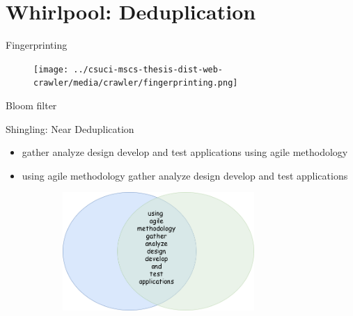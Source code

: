 \documentclass[9pt]{beamer}
\begin{document}
\section[Dedupe]{Whirlpool: Deduplication}
\begin{frame}[plain]
\end{frame}


\begin{frame}{Fingerprinting}
  \begin{figure}
    \centering
    \texttt{[image: ../csuci-mscs-thesis-dist-web-crawler/media/crawler/fingerprinting.png]}
  \end{figure}
\end{frame}


\begin{frame}{Bloom filter}
  
\end{frame}


\begin{frame}{Shingling: Near Deduplication}
  \pause
  \begin{itemize}
  \item gather analyze design develop and test applications using agile methodology
  \item using agile methodology gather analyze design develop and test applications
  \end{itemize}
  \pause
  \begin{figure}
    \centering
    \includegraphics[width=9.5cm,height=4.5cm]{img/bagofwords.png}
  \end{figure}
\end{frame}

\end{document}
